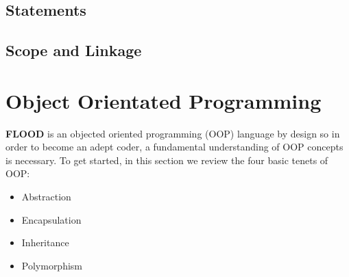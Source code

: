 \documentclass[12pt]{report}
\begin{document}
\subsection{Statements}

\subsection{Scope and Linkage}

\section{Object Orientated Programming}

\begin{doublespace}
\textbf{FLOOD} is an objected oriented programming (OOP) language by design so in order to become an adept coder, a fundamental understanding of OOP concepts is necessary. To get started, in this section we review the four basic tenets of OOP:
\begin{itemize}
\setlength{\itemsep}{1pt}
\item Abstraction
\item Encapsulation
\item Inheritance
\item Polymorphism
\end{itemize}
\end{doublespace}
\end{document}
